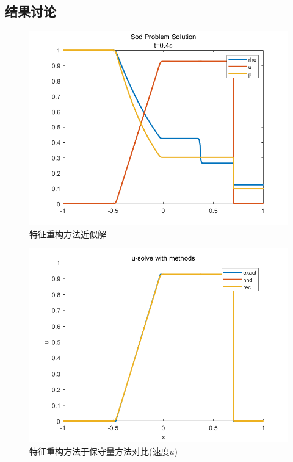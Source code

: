 \documentclass[12pt,a4paper]{article}%
\begin{document}
		\subsection{结果讨论}
		\begin{figure}[H]
			\centering
			\begin{minipage}{1\textwidth}
				\centering
				\includegraphics[width=\textwidth]{./fig/app4.png}
				\caption{\fontsize{10pt}{15pt}\selectfont 特征重构方法近似解}
			\end{minipage}
		\end{figure}
		\begin{figure}[H]
			\centering
			\begin{minipage}{1\textwidth}
				\centering
				\includegraphics[width=\textwidth]{./fig/u-3.png}
				\caption{\fontsize{10pt}{15pt}\selectfont 特征重构方法于保守量方法对比(速度$u$)}
			\end{minipage}
		\end{figure}
\end{document}
